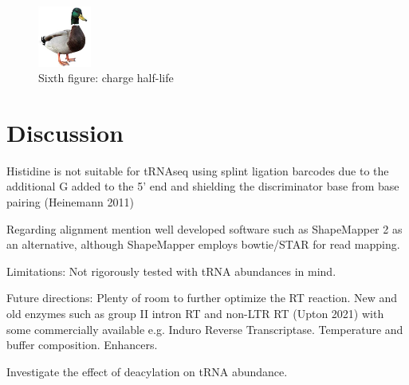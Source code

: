 \documentclass[9pt,lineno]{elife}
\begin{document}
\begin{figure}[ht!]
\centering
\includegraphics[height=2cm]{figures/duck.jpg}
\caption{
Sixth figure: charge half-life
}
\label{fig:fig6}
\end{figure}














\section{Discussion}


Histidine is not suitable for tRNAseq using splint ligation barcodes due to the additional G added to the 5' end and shielding the discriminator base from base pairing (Heinemann 2011)


Regarding alignment mention well developed software such as ShapeMapper 2 as an alternative, although ShapeMapper employs bowtie/STAR for read mapping.



Limitations:
Not rigorously tested with tRNA abundances in mind.



Future directions:
Plenty of room to further optimize the RT reaction.
New and old enzymes such as group II intron RT and non-LTR RT (Upton 2021) with some commercially available e.g. Induro Reverse Transcriptase.
Temperature and buffer composition.
Enhancers.


Investigate the effect of deacylation on tRNA abundance.
\end{document}
